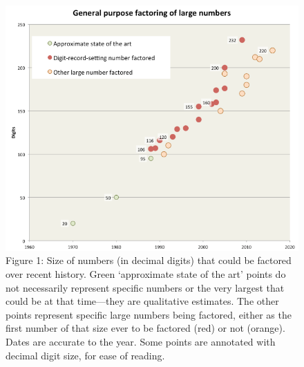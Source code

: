 \documentclass[11pt]{article}
\begin{document}
%

\begin{figure}[H]
    \centering
        \includegraphics[scale=.6]{figures/GPR - 2.png}
    \caption{Figure 1: Size of numbers (in decimal digits) that could be factored over recent history. Green ‘approximate state of the art’ points do not necessarily represent specific numbers or the very largest that could be at that time—they are qualitative estimates. The other points represent specific large numbers being factored, either as the first number of that size ever to be factored (red) or not (orange). Dates are accurate to the year. Some points are annotated with decimal digit size, for ease of reading.
}

    \label{fig:1}
\end{figure}


\end{document}
